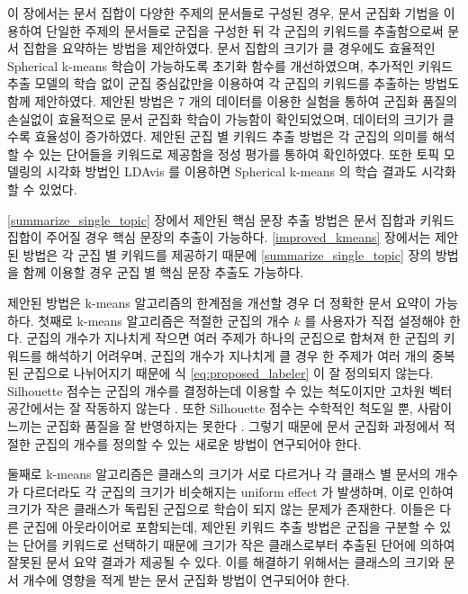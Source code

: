 \documentclass[oneside, ko,phd]{snuthesis_utf8_kor}
\begin{document}
이 장에서는 문서 집합이 다양한 주제의 문서들로 구성된 경우, 문서 군집화 기법을 이용하여 단일한 주제의 문서들로 군집을 구성한 뒤 각 군집의 키워드를 추출함으로써 문서 집합을 요약하는 방법을 제안하였다.
문서 집합의 크기가 클 경우에도 효율적인 Spherical k-means 학습이 가능하도록 초기화 함수를 개선하였으며, 추가적인 키워드 추출 모델의 학습 없이 군집 중심값만을 이용하여 각 군집의 키워드를 추출하는 방법도 함께 제안하였다.
제안된 방법은 7 개의 데이터를 이용한 실험을 통하여 군집화 품질의 손실없이 효율적으로 문서 군집화 학습이 가능함이 확인되었으며, 데이터의 크기가 클수록 효율성이 증가하였다.
제안된 군집 별 키워드 추출 방법은 각 군집의 의미를 해석할 수 있는 단어들을 키워드로 제공함을 정성 평가를 통하여 확인하였다.
또한 토픽 모델링의 시각화 방법인 LDAvis 를 이용하면 Spherical k-means 의 학습 결과도 시각화 할 수 있었다.

\ref{summarize_single_topic} 장에서 제안된 핵심 문장 추출 방법은 문서 집합과 키워드 집합이 주어질 경우 핵심 문장의 추출이 가능하다.
\ref{improved_kmeans} 장에서는 제안된 방법은 각 군집 별 키워드를 제공하기 때문에 \ref{summarize_single_topic} 장의 방법을 함께 이용할 경우 군집 별 핵심 문장 추출도 가능하다.

제안된 방법은 k-means 알고리즘의 한계점을 개선할 경우 더 정확한 문서 요약이 가능하다.
첫째로 k-means 알고리즘은 적절한 군집의 개수 $k$ 를 사용자가 직접 설정해야 한다.
군집의 개수가 지나치게 작으면 여러 주제가 하나의 군집으로 합쳐져 한 군집의 키워드를 해석하기 어려우며, 군집의 개수가 지나치게 클 경우 한 주제가 여러 개의 중복된 군집으로 나뉘어지기 때문에 식 \ref{eq:proposed_labeler} 이 잘 정의되지 않는다.
Silhouette 점수는 군집의 개수를 결정하는데 이용할 수 있는 척도이지만 고차원 벡터 공간에서는 잘 작동하지 않는다 \cite{almeida2011there}.
또한 Silhouette 점수는 수학적인 척도일 뿐, 사람이 느끼는 군집화 품질을 잘 반영하지는 못한다 \cite{newman2010evaluating}.
그렇기 때문에 문서 군집화 과정에서 적절한 군집의 개수를 정의할 수 있는 새로운 방법이 연구되어야 한다.

둘째로 k-means 알고리즘은 클래스의 크기가 서로 다르거나 각 클래스 별 문서의 개수가 다르더라도 각 군집의 크기가 비슷해지는 uniform effect \cite{xiong2008k} 가 발생하며, 이로 인하여 크기가 작은 클래스가 독립된 군집으로 학습이 되지 않는 문제가 존재한다.
이들은 다른 군집에 아웃라이어로 포함되는데, 제안된 키워드 추출 방법은 군집을 구분할 수 있는 단어를 키워드로 선택하기 때문에 크기가 작은 클래스로부터 추출된 단어에 의하여 잘못된 문서 요약 결과가 제공될 수 있다.
이를 해결하기 위해서는 클래스의 크기와 문서 개수에 영향을 적게 받는 문서 군집화 방법이 연구되어야 한다.
\end{document}

